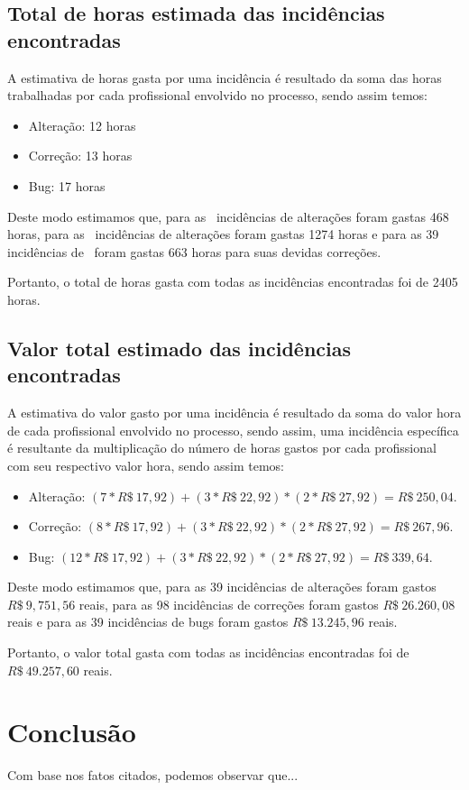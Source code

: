 \documentclass[11pt, a4paper]{article}
\begin{document}
\subsection{Total de horas estimada das incidências encontradas}
A estimativa de horas gasta por uma incidência é resultado da soma das horas trabalhadas por cada profissional envolvido no processo, sendo assim temos:

\begin{itemize}
	\item Alteração: 12 horas
	\item Correção: 13 horas
	\item Bug: 17 horas
\end{itemize}

Deste modo estimamos que, para as \alteracoes~incidências de alterações foram gastas 468 horas, para as \correcoes~incidências de alterações foram gastas 1274 horas e para as 39 incidências de \bugs~foram gastas 663 horas para suas devidas correções.

Portanto, o total de horas gasta com todas as incidências encontradas foi de 2405 horas.

\subsection{Valor total estimado das incidências encontradas}
A estimativa do valor gasto por uma incidência é resultado da soma do valor hora de cada profissional envolvido no processo, sendo assim, uma incidência específica é resultante da multiplicação do número de horas gastos por cada profissional com seu respectivo valor hora, sendo assim temos:

\begin{itemize}
	\item Alteração: $(7 * R\$~17,92) +  (3 * R\$~22,92) * (2 * R\$~27,92) = R\$~250,04$.
	\item Correção: $(8 * R\$~17,92) +  (3 * R\$~22,92) * (2 * R\$~27,92) = R\$~267,96$.
	\item Bug: $(12 * R\$~17,92) +  (3 * R\$~22,92) * (2 * R\$~27,92) = R\$~339,64$.
\end{itemize}

Deste modo estimamos que, para as 39 incidências de alterações foram gastos $R\$~9,751,56$ reais, para as 98 incidências de correções foram gastos $R\$~26.260,08$ reais e para as 39 incidências de bugs foram gastos $R\$~13.245,96$ reais.

Portanto, o valor total gasta com todas as incidências encontradas foi de  $R\$~49.257,60$ reais.

\section{Conclusão}
Com base nos fatos citados, podemos observar que...


\end{document}

